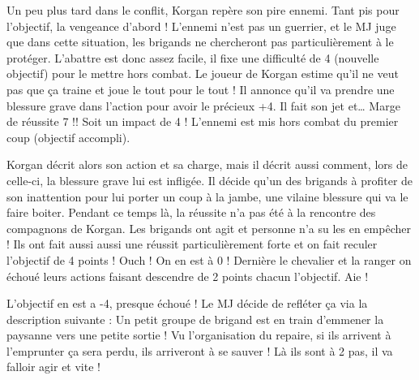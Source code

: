 {Un peu plus tard dans le conflit, Korgan repère son pire ennemi. Tant pis pour l’objectif, la vengeance d’abord ! L’ennemi n’est pas un guerrier, et le MJ juge que dans cette situation, les brigands ne chercheront pas particulièrement à le protéger. L’abattre est donc assez facile, il fixe une difficulté de 4 (nouvelle objectif) pour le mettre hors combat. Le joueur de Korgan estime qu’il ne veut pas que ça traine et joue le tout pour le tout ! Il annonce qu’il va prendre une blessure grave dans l’action pour avoir le précieux +4. Il fait son jet et… Marge de réussite 7 !! Soit un impact de 4 ! L’ennemi est mis hors combat du premier coup (objectif accompli).

Korgan décrit alors son action et sa charge, mais il décrit aussi comment, lors de celle-ci, la blessure grave lui est infligée. Il décide qu’un des brigands à profiter de son inattention pour lui porter un coup à la jambe, une vilaine blessure qui va le faire boiter. Pendant ce temps là, la réussite n’a pas été à la rencontre des compagnons de Korgan. Les brigands ont agit et personne n'a su les en empêcher ! Ils ont fait aussi aussi une réussit particulièrement forte et on fait reculer l'objectif de 4 points ! Ouch ! On en est à 0 ! Dernière le chevalier et la ranger on échoué leurs actions faisant descendre de 2 points chacun l'objectif. Aie !

L’objectif en est a -4, presque échoué ! Le MJ décide de refléter ça via la description suivante :
Un petit groupe de brigand est en train d’emmener la paysanne vers une petite sortie ! Vu l’organisation du repaire, si ils arrivent à l’emprunter ça sera perdu, ils arriveront à se sauver ! Là ils sont à 2 pas, il va falloir agir et vite !

}

